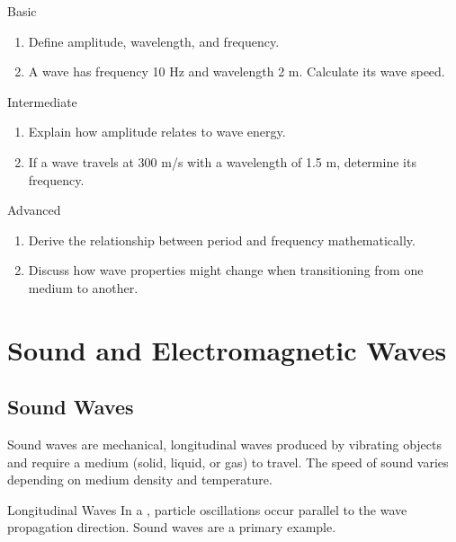 \begin{tieredquestions}{Basic}
\begin{enumerate}
\item Define amplitude, wavelength, and frequency.
\item A wave has frequency 10 Hz and wavelength 2 m. Calculate its wave speed.
\end{enumerate}
\end{tieredquestions}

\begin{tieredquestions}{Intermediate}
\begin{enumerate}
\item Explain how amplitude relates to wave energy.
\item If a wave travels at 300 m/s with a wavelength of 1.5 m, determine its frequency.
\end{enumerate}
\end{tieredquestions}

\begin{tieredquestions}{Advanced}
\begin{enumerate}
\item Derive the relationship between period and frequency mathematically.
\item Discuss how wave properties might change when transitioning from one medium to another.
\end{enumerate}
\end{tieredquestions}

\FloatBarrier

\section{Sound and Electromagnetic Waves}
\FloatBarrier

\subsection{Sound Waves}
\FloatBarrier

Sound waves are mechanical, longitudinal waves produced by vibrating objects and require a medium (solid, liquid, or gas) to travel. The speed of sound varies depending on medium density and temperature.

\begin{keyconcept}{Longitudinal Waves}
In a , particle oscillations occur parallel to the wave propagation direction. Sound waves are a primary example.
\end{keyconcept}

